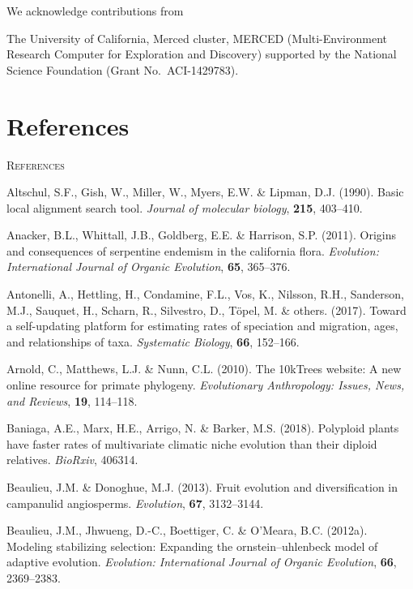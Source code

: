 \documentclass[]{article}
\begin{document}
We acknowledge contributions from

The University of California, Merced cluster, MERCED (Multi-Environment Research Computer for Exploration and Discovery) supported by the National Science Foundation (Grant No.~ACI-1429783).

\hypertarget{references}{%
\section{References}\label{references}}

\newpage
\begin{center}
\textsc{References}
\end{center}

\hypertarget{refs}{}
\leavevmode\hypertarget{ref-altschul1990basic}{}%
Altschul, S.F., Gish, W., Miller, W., Myers, E.W. \& Lipman, D.J. (1990). Basic local alignment search tool. \emph{Journal of molecular biology}, \textbf{215}, 403--410.

\leavevmode\hypertarget{ref-anacker2011origins}{}%
Anacker, B.L., Whittall, J.B., Goldberg, E.E. \& Harrison, S.P. (2011). Origins and consequences of serpentine endemism in the california flora. \emph{Evolution: International Journal of Organic Evolution}, \textbf{65}, 365--376.

\leavevmode\hypertarget{ref-antonelli2017toward}{}%
Antonelli, A., Hettling, H., Condamine, F.L., Vos, K., Nilsson, R.H., Sanderson, M.J., Sauquet, H., Scharn, R., Silvestro, D., Töpel, M. \& others. (2017). Toward a self-updating platform for estimating rates of speciation and migration, ages, and relationships of taxa. \emph{Systematic Biology}, \textbf{66}, 152--166.

\leavevmode\hypertarget{ref-arnold201010ktrees}{}%
Arnold, C., Matthews, L.J. \& Nunn, C.L. (2010). The 10kTrees website: A new online resource for primate phylogeny. \emph{Evolutionary Anthropology: Issues, News, and Reviews}, \textbf{19}, 114--118.

\leavevmode\hypertarget{ref-baniaga2018polyploid}{}%
Baniaga, A.E., Marx, H.E., Arrigo, N. \& Barker, M.S. (2018). Polyploid plants have faster rates of multivariate climatic niche evolution than their diploid relatives. \emph{BioRxiv}, 406314.

\leavevmode\hypertarget{ref-beaulieu2013fruit}{}%
Beaulieu, J.M. \& Donoghue, M.J. (2013). Fruit evolution and diversification in campanulid angiosperms. \emph{Evolution}, \textbf{67}, 3132--3144.

\leavevmode\hypertarget{ref-beaulieu2012modeling}{}%
Beaulieu, J.M., Jhwueng, D.-C., Boettiger, C. \& O'Meara, B.C. (2012a). Modeling stabilizing selection: Expanding the ornstein--uhlenbeck model of adaptive evolution. \emph{Evolution: International Journal of Organic Evolution}, \textbf{66}, 2369--2383.
\end{document}
